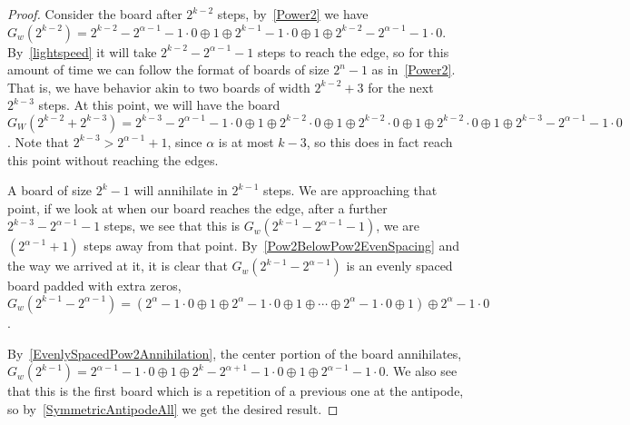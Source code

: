 \documentclass[12pt,letterpaper]{article}
\begin{document}
\begin{proof} %
  Consider the board after $2^{k-2}$ steps, by~\cref{Power2} we have $G_w(2^{k-2})=2^{k-2}-2^{\alpha-1}-1\cdot 0\oplus 1\oplus 2^{k-1}-1\cdot 0 \oplus 1\oplus 2^{k-2}-2^{\alpha-1}-1\cdot 0$. By~\cref{lightspeed} it will take $2^{k-2}-2^{\alpha-1}-1$ steps to reach the edge, so for this amount of time we can follow the format of boards of size $2^n-1$ as in~\cref{Power2}. That is, we have behavior akin to two boards of width $2^{k-2}+3$ for the next $2^{k-3}$ steps. At this point, we will have the board $G_W(2^{k-2}+2^{k-3}) = 2^{k-3}-2^{\alpha-1}-1\cdot 0 \oplus 1\oplus 2^{k-2}\cdot 0\oplus 1\oplus 2^{k-2}\cdot 0\oplus 1\oplus 2^{k-2}\cdot 0\oplus 1\oplus 2^{k-3}-2^{\alpha-1}-1\cdot 0$. Note that $2^{k-3}>2^{\alpha-1}+1$, since $\alpha$ is at most $k-3$, so this does in fact reach this point without reaching the edges.
  
  A board of size $2^k-1$ will annihilate in $2^{k-1}$ steps. We are approaching that point, if we look at when our board reaches the edge, after a further $2^{k-3}-2^{\alpha-1}-1$ steps, we see that this is $G_w(2^{k-1}-2^{\alpha-1}-1)$, we are $(2^{\alpha-1}+1)$ steps away from that point. By~\cref{Pow2BelowPow2EvenSpacing} and the way we arrived at it, it is clear that $G_w(2^{k-1}-2^{\alpha-1})$ is an evenly spaced board padded with extra zeros, $G_w(2^{k-1}-2^{\alpha-1})=(2^\alpha-1\cdot 0\oplus 1\oplus2^\alpha-1\cdot 0\oplus 1\oplus\cdots\oplus2^\alpha-1\cdot 0\oplus 1)\oplus 2^\alpha-1\cdot 0$. 

  By~\cref{EvenlySpacedPow2Annihilation}, the center portion of the board annihilates, $G_w(2^{k-1})=2^{\alpha-1}-1\cdot 0\oplus 1\oplus 2^k-2^{\alpha+1}-1\cdot 0\oplus 1\oplus 2^{\alpha-1}-1\cdot 0$. We also see that this is the first board which is a repetition of a previous one at the antipode, so by~\cref{SymmetricAntipodeAll} we get the desired result. 
\end{proof}
\end{document}
